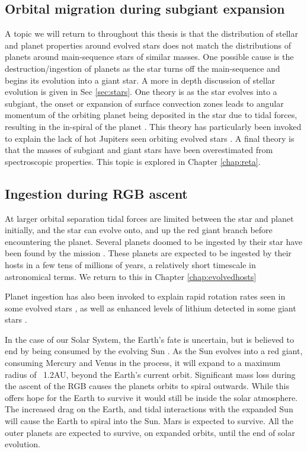 \subsection{Orbital migration during subgiant expansion}
A topic we will return to throughout this thesis is that the distribution of stellar and planet properties around evolved stars does not match the distributions of planets around main-sequence stars of similar masses. One possible cause is the destruction/ingestion of planets as the star turns off the main-sequence and begins its evolution into a giant star. A more in depth discussion of stellar evolution is given in Sec \ref{sec:stars}. One theory is as the star evolves into a subgiant, the onset or expansion of surface convection zones leads to angular momentum of the orbiting planet being deposited in the star due to tidal forces, resulting in the in-spiral of the planet \citep{2013Schlaufman}. This theory has particularly been invoked to explain the lack of hot Jupiters seen orbiting evolved stars \citep{2013Schlaufman}. A final theory is that the masses of subgiant and giant stars have been overestimated from spectroscopic properties. This topic is explored in Chapter \ref{chap:reta}.

\subsection{Ingestion during RGB ascent}
At larger orbital separation tidal forces are limited between the star and planet initially, and the star can evolve onto, and up the red giant branch before encountering the planet. Several planets doomed to be ingested by their star have been found by the \Kepler mission \citep{Kepler56,Kepler432}. These planets are expected to be ingested by their hosts in a few tens of millions of years, a relatively short timescale in astronomical terms. We return to this in Chapter \ref{chap:evolvedhosts}

Planet ingestion has also been invoked to explain rapid rotation rates seen in some evolved stars \citep{2008Massarotti,2009Carlberg}, as well as enhanced levels of lithium detected in some giant stars \citep{2002Sandquist,2012Adam}.

In the case of our Solar System, the Earth's fate is uncertain, but is believed to end by being consumed by the evolving Sun \citep{Rybicki2001,earthdeath,2016Veras}. As the Sun evolves into a red giant, consuming Mercury and Venus in the process, it will expand to a maximum radius of ~1.2AU, beyond the Earth's current orbit. Significant mass loss during the ascent of the RGB causes the planets orbits to spiral outwards. While this offers hope for the Earth to survive it would still be inside the solar atmosphere. The increased drag on the Earth, and tidal interactions with the expanded Sun will cause the Earth to spiral into the Sun. Mars is expected to survive. All the outer planets are expected to survive, on expanded orbits, until the end of solar evolution.


